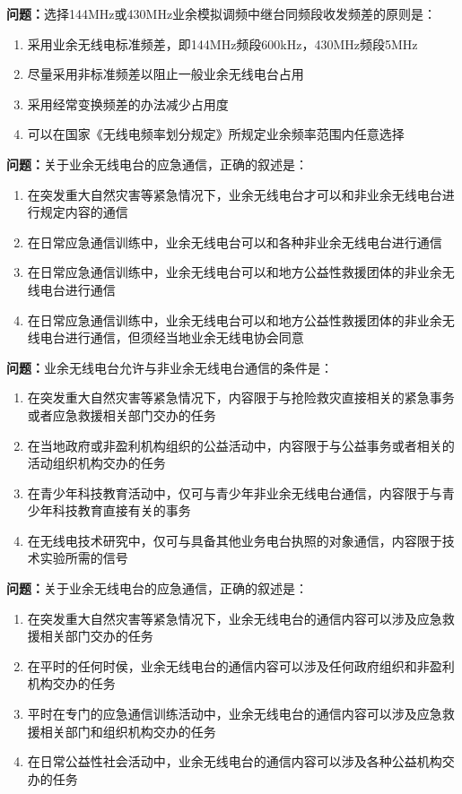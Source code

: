 \bigskip


\noindent\textbf{问题：}选择144MHz或430MHz业余模拟调频中继台同频段收发频差的原则是：
\begin{enumerate}[label=\Alph*), leftmargin=3em]
\item 采用业余无线电标准频差，即144MHz频段600kHz，430MHz频段5MHz
\item 尽量采用非标准频差以阻止一般业余无线电台占用
\item 采用经常变换频差的办法减少占用度
\item 可以在国家《无线电频率划分规定》所规定业余频率范围内任意选择
\end{enumerate}

\bigskip


\noindent\textbf{问题：}关于业余无线电台的应急通信，正确的叙述是：
\begin{enumerate}[label=\Alph*), leftmargin=3em]
\item 在突发重大自然灾害等紧急情况下，业余无线电台才可以和非业余无线电台进行规定内容的通信
\item 在日常应急通信训练中，业余无线电台可以和各种非业余无线电台进行通信
\item 在日常应急通信训练中，业余无线电台可以和地方公益性救援团体的非业余无线电台进行通信
\item 在日常应急通信训练中，业余无线电台可以和地方公益性救援团体的非业余无线电台进行通信，但须经当地业余无线电协会同意
\end{enumerate}

\bigskip


\noindent\textbf{问题：}业余无线电台允许与非业余无线电台通信的条件是：
\begin{enumerate}[label=\Alph*), leftmargin=3em]
\item 在突发重大自然灾害等紧急情况下，内容限于与抢险救灾直接相关的紧急事务或者应急救援相关部门交办的任务
\item 在当地政府或非盈利机构组织的公益活动中，内容限于与公益事务或者相关的活动组织机构交办的任务
\item 在青少年科技教育活动中，仅可与青少年非业余无线电台通信，内容限于与青少年科技教育直接有关的事务
\item 在无线电技术研究中，仅可与具备其他业务电台执照的对象通信，内容限于技术实验所需的信号
\end{enumerate}

\bigskip


\noindent\textbf{问题：}关于业余无线电台的应急通信，正确的叙述是：
\begin{enumerate}[label=\Alph*), leftmargin=3em]
\item 在突发重大自然灾害等紧急情况下，业余无线电台的通信内容可以涉及应急救援相关部门交办的任务
\item 在平时的任何时侯，业余无线电台的通信内容可以涉及任何政府组织和非盈利机构交办的任务
\item 平时在专门的应急通信训练活动中，业余无线电台的通信内容可以涉及应急救援相关部门和组织机构交办的任务
\item 在日常公益性社会活动中，业余无线电台的通信内容可以涉及各种公益机构交办的任务
\end{enumerate}

